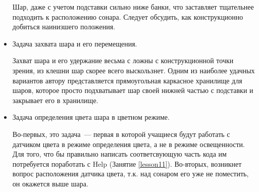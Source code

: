 \begin{itemize}
	Шар, даже с учетом подставки сильно ниже банки, что заставляет тщательнее подходить к расположению сонара. Следует обсудить, как конструкционно добиться наинизшего положения.
	\item Задача захвата шара и его перемещения.
	
	Захват шара и его удержание весьма с ложны с конструкционной точки зрения, из клешни шар скорее всего выскользнет. Одним из наиболее удачных вариантов автору представляется прямоугольная каркасное хранилище для шаров, которое просто подхватывает шар своей нижней частью с подставки и закрывает его в хранилище.
	\item  Задача определения цвета шара в цветном режиме.
	
	Во-первых, это задача~--- первая в которой учащиеся будут работать с датчиком цвета в режиме определения цвета, а не в режиме освещенности. Для того, что бы правильно написать соответсвующую часть кода им потребуется поработать с Help (Занятие \ref{lesson11}).  Во-вторых,  возникнет вопрос расположения датчика цвета, т.к. над сонаром его уже не поместить, он окажется выше шара.
\end{itemize}